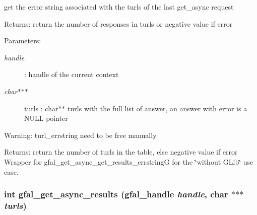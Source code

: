 get the error string associated with the turls of the last get\_\-async request \begin{Desc}
\item[Returns:]return the number of responses in turls or negative value if error \end{Desc}
\begin{Desc}
\item[Parameters:]
\begin{description}
\item[{\em handle}]: handle of the current context \item[{\em char$\ast$$\ast$$\ast$}]turls : char$\ast$$\ast$ turls with the full list of answer, an answer with error is a NULL pointer \end{description}
\end{Desc}
\begin{Desc}
\item[Warning:]turl\_\-errstring need to be free manually \end{Desc}
\begin{Desc}
\item[Returns:]return the number of turls in the table, else negative value if error Wrapper for gfal\_\-get\_\-async\_\-get\_\-results\_\-errstring\-G for the \char`\"{}without GLib\char`\"{} use case. \end{Desc}
\subsubsection{\setlength{\rightskip}{0pt plus 5cm}int gfal\_\-get\_\-async\_\-results (gfal\_\-handle {\em handle}, char $\ast$$\ast$$\ast$ {\em turls})}\label{gfal__common__interface_8h_0c654545b837b8e1928842ee762ce5e9}


